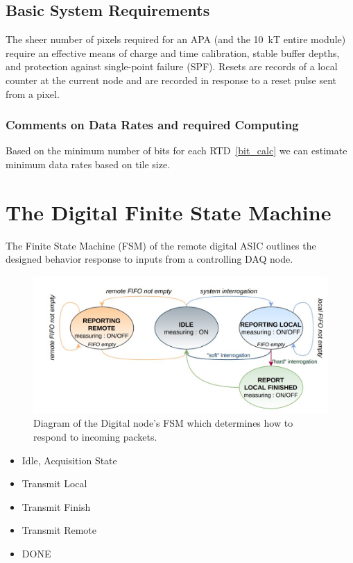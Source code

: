 \subsection{Basic System Requirements}

The sheer number of pixels required for an APA (and the 10~\unit{kT} entire module) require an effective means of charge and time calibration, stable buffer depths, and protection against single-point failure (SPF).
Resets are records of a local counter at the current node and are recorded in response to a reset pulse sent from a pixel.

\subsubsection{Comments on Data Rates and required Computing}

Based on the minimum number of bits for each RTD~\ref{bit_calc} we can estimate minimum data rates based on tile size.


\section{The Digital Finite State Machine}

The Finite State Machine (FSM) of the remote digital ASIC outlines the designed behavior response to inputs from a controlling DAQ node.

\begin{figure}[]
\centering
\includegraphics[width=\textwidth]{images/digital_fsm_overview.jpg}
\caption{Diagram of the Digital node's FSM which determines how to respond to incoming packets.}
\end{figure}

\begin{itemize}
    \item Idle, Acquisition State
    \item Transmit Local
    \item Transmit Finish
    \item Transmit Remote
    \item DONE
\end{itemize}~\label{fsm_state_labels}

